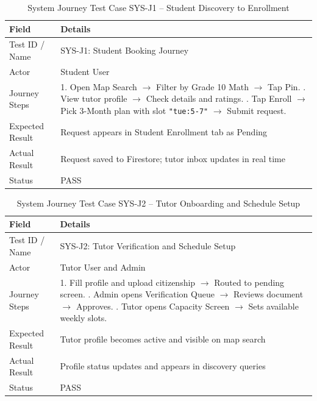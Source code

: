 \documentclass[12pt]{report}
\begin{document}
\begin{table}[H]
\centering
\caption{System Journey Test Case SYS-J1 -- Student Discovery to Enrollment}
\label{tab:sysj1}
\small
\begin{tabular}{|p{3.2cm}|p{11.5cm}|}
\hline
\textbf{Field} & \textbf{Details} \\
\hline
Test ID / Name & SYS-J1: Student Booking Journey \\
\hline
Actor & Student User \\
\hline
Journey Steps & 1. Open Map Search $\to$ Filter by Grade 10 Math $\to$ Tap Pin. \newline
2. View tutor profile $\to$ Check details and ratings. \newline
3. Tap Enroll $\to$ Pick 3-Month plan with slot \texttt{"tue:5-7"} $\to$ Submit request. \\
\hline
Expected Result & Request appears in Student Enrollment tab as Pending \\
\hline
Actual Result & Request saved to Firestore; tutor inbox updates in real time \\
\hline
Status & PASS \\
\hline
\end{tabular}
\end{table}

\begin{table}[H]
\centering
\caption{System Journey Test Case SYS-J2 -- Tutor Onboarding and Schedule Setup}
\label{tab:sysj2}
\small
\begin{tabular}{|p{3.2cm}|p{11.5cm}|}
\hline
\textbf{Field} & \textbf{Details} \\
\hline
Test ID / Name & SYS-J2: Tutor Verification and Schedule Setup \\
\hline
Actor & Tutor User and Admin \\
\hline
Journey Steps & 1. Fill profile and upload citizenship $\to$ Routed to pending screen. \newline
2. Admin opens Verification Queue $\to$ Reviews document $\to$ Approves. \newline
3. Tutor opens Capacity Screen $\to$ Sets available weekly slots. \\
\hline
Expected Result & Tutor profile becomes active and visible on map search \\
\hline
Actual Result & Profile status updates and appears in discovery queries \\
\hline
Status & PASS \\
\hline
\end{tabular}
\end{table}
\end{document}
